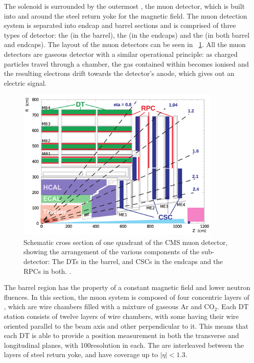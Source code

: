 The solenoid is surrounded by the outermost \subdetector, the muon detector, which is built into and around the steel return yoke for the magnetic field.
The \CMS muon detection system is separated into endcap and barrel sections and is comprised of three types of detector: the \DTs (in the barrel), the \CSCs (in the endcaps) and the \RPCs (in both barrel and endcaps). The layout of the muon detectors can be seen in \Fig~\ref{fig:muonssystem}. All the muon detectors are gaseous detector with a similar operational principle: as charged particles travel through a chamber, the gas contained within becomes ionised and the resulting electrons drift towards the detector's anode, which gives out an electric signal. 
\begin{figure}[h]
\centering
\includegraphics[width=0.9\textwidth]{detectorFigures/cmsMuonSystem.png}
\caption{Schematic cross section of one quadrant of the CMS muon detector, showing the arrangement of the various components of the sub-detector: The DTs in the barrel, and CSCs in the endcaps and the RPCs in both. \cite{MuonReco}.}
\label{fig:muonssystem}
\end{figure}

The barrel region has the property of a constant magnetic field and lower neutron fluences. In this section, the muon system is composed of four concentric  layers of \DTs, which are wire chambers filled with a mixture of gaseous Ar and CO$_{2}$. Each DT station consists of twelve layers of wire chambers, with some having their wire oriented parallel to the beam axis and other perpendicular to it. This means that each DT is able to provide a position measurement in both the transverse and longitudinal planes, with 100\um resolution in each. The \DTs are interleaved between the layers of steel return yoke, and have coverage up to $|\eta|<1.3$. 

